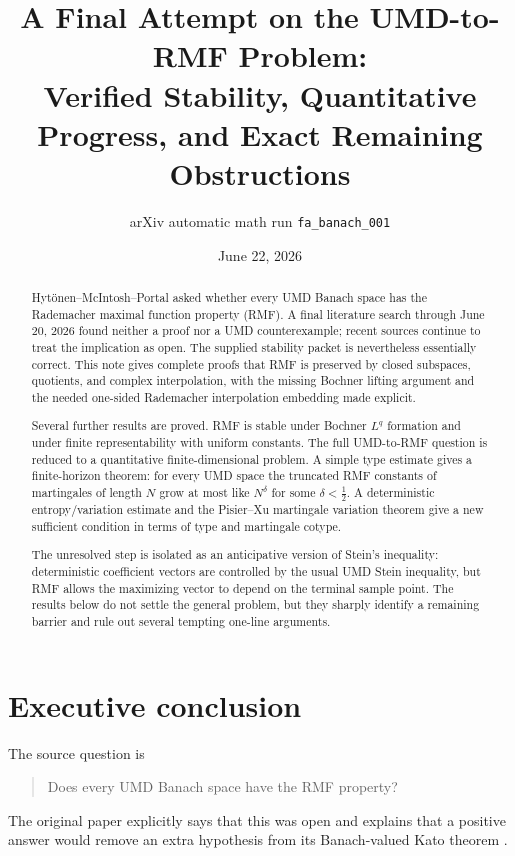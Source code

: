 \documentclass[11pt]{article}
\title{A Final Attempt on the UMD-to-RMF Problem:\\
Verified Stability, Quantitative Progress, and Exact Remaining Obstructions}
\author{arXiv automatic math run \texttt{fa\_banach\_001}}
\date{June 22, 2026}
\theoremstyle{definition}
\newcommand{\1}{\mathbf 1}
\begin{document}
\maketitle

\begin{abstract}
Hyt\"onen--McIntosh--Portal asked whether every UMD Banach space has the
Rademacher maximal function property (RMF).  A final literature search through
June 20, 2026 found neither a proof nor a UMD counterexample; recent sources
continue to treat the implication as open.  The supplied stability packet is
nevertheless essentially correct.  This note gives complete proofs that RMF is
preserved by closed subspaces, quotients, and complex interpolation, with the
missing Bochner lifting argument and the needed one-sided Rademacher
interpolation embedding made explicit.

Several further results are proved.  RMF is stable under Bochner $L^q$
formation and under finite representability with uniform constants.  The full
UMD-to-RMF question is reduced to a quantitative finite-dimensional problem.  A
simple type estimate gives a finite-horizon theorem: for every UMD space the
truncated RMF constants of martingales of length $N$ grow at most like
$N^\delta$ for some $\delta<\tfrac12$.  A deterministic entropy/variation
estimate and the Pisier--Xu martingale variation theorem give a new sufficient
condition in terms of type and martingale cotype.

The unresolved step is isolated as an anticipative version of Stein's
inequality: deterministic coefficient vectors are controlled by the usual UMD
Stein inequality, but RMF allows the maximizing vector to depend on the terminal
sample point.  The results below do not settle the general problem, but they
sharply identify a remaining barrier and rule out several tempting one-line
arguments.
\end{abstract}

\section{Executive conclusion}

The source question is
\begin{quote}
Does every UMD Banach space have the RMF property?
\end{quote}
The original paper explicitly says that this was open and explains that a
positive answer would remove an extra hypothesis from its Banach-valued Kato
theorem \cite[Definition 2.12 and the paragraph following it]{HMP}.
\end{document}
